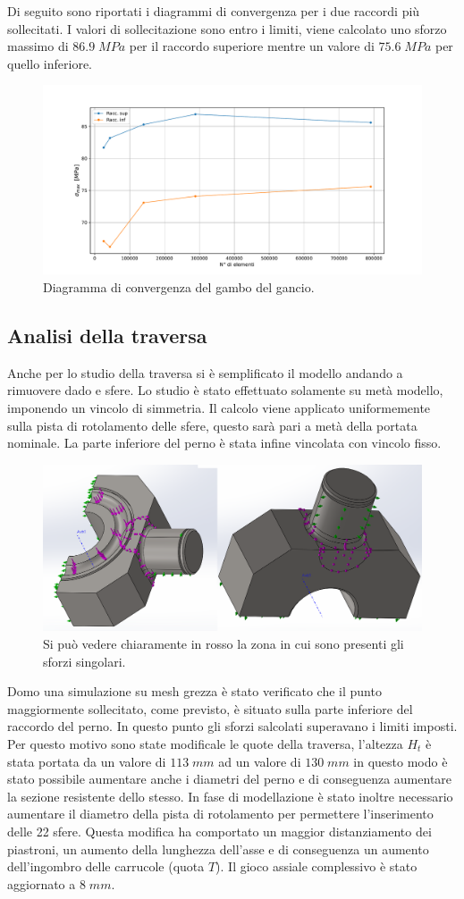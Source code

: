 Di seguito sono riportati i diagrammi di convergenza per i due raccordi più sollecitati. 
I valori di sollecitazione sono entro i limiti, viene calcolato uno sforzo massimo di $86.9\;MPa$ per il raccordo superiore mentre un valore di $75.6\;MPa$ per quello inferiore. 
\begin{figure}[H]
\centering
  \includegraphics[width=.6\textwidth]{imgs/fem/GamboGancioConv}
\caption{Diagramma di convergenza del gambo del gancio.}
\label{fig:GamboGancioConv}
\end{figure}

\subsection{Analisi della traversa}
Anche per lo studio della traversa si è semplificato il modello andando a rimuovere dado e sfere. Lo studio è stato effettuato solamente su metà modello, imponendo un vincolo di simmetria.
Il calcolo viene applicato uniformemente sulla pista di rotolamento delle sfere, questo sarà pari a metà della portata nominale.
La parte inferiore del perno è stata infine vincolata con vincolo fisso. 

\begin{figure}[H]
\centering
  \includegraphics[width=.8\textwidth]{imgs/fem/SimTraversaCarico}
\caption{Si può vedere chiaramente in rosso la zona in cui sono presenti gli sforzi singolari.}
\label{fig:GamboGancioConv}
\end{figure}
Domo una simulazione su mesh grezza è stato verificato che il punto maggiormente sollecitato, come previsto, è situato sulla parte inferiore del raccordo del perno. 
In questo punto gli sforzi salcolati superavano i limiti imposti. 
Per questo motivo sono state modificale le quote della traversa, l'altezza $H_t$ è stata portata da un valore di $113 \; mm$ ad un valore di $130 \; mm$ in questo modo è stato possibile aumentare anche i diametri del perno e di conseguenza aumentare la sezione resistente dello stesso. 
In fase di modellazione è stato inoltre necessario aumentare il diametro della pista di rotolamento per permettere l'inserimento delle 22 sfere. 
Questa modifica ha comportato un maggior distanziamento dei piastroni, un aumento della lunghezza dell'asse e di conseguenza un aumento dell'ingombro delle carrucole (quota $T$). Il gioco assiale complessivo è stato aggiornato a $8\;mm$.

